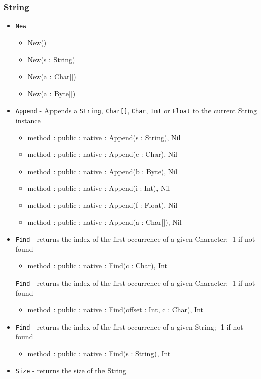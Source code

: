 \documentclass[12pt]{article}
\begin{document}
\subsubsection{String}
\begin{itemize}
\item \texttt{New} 
  \begin{itemize}
  \item New()
  \item New(s : String)
  \item New(a : Char[])
  \item New(a : Byte[])
  \end{itemize}
\item \texttt{Append} - Appends a \texttt{String}, \texttt{Char[]}, \texttt{Char}, \texttt{Int} or \texttt{Float} to the current String instance
  \begin{itemize}
  \item method : public : native : Append(s : String), Nil
  \item method : public : native : Append(c : Char), Nil
  \item method : public : native : Append(b : Byte), Nil
  \item method : public : native : Append(i : Int), Nil
  \item method : public : native : Append(f : Float), Nil
  \item method : public : native : Append(a : Char[]), Nil
  \end{itemize}
\item 
  \texttt{Find} - returns the index of the first occurrence of a given Character; -1 if not found
  \begin{itemize}
  \item method : public : native : Find(c : Char), Int
  \end{itemize}
  \texttt{Find} - returns the index of the first occurrence of a given Character; -1 if not found
  \begin{itemize}
  \item method : public : native : Find(offset : Int, c : Char), Int
  \end{itemize}
\item \texttt{Find} - returns the index of the first occurrence of a given String; -1 if not found
  \begin{itemize}
  \item method : public : native : Find(s : String), Int
  \end{itemize}
\item \texttt{Size} - returns the size of the String

\end{itemize}
\end{document}
